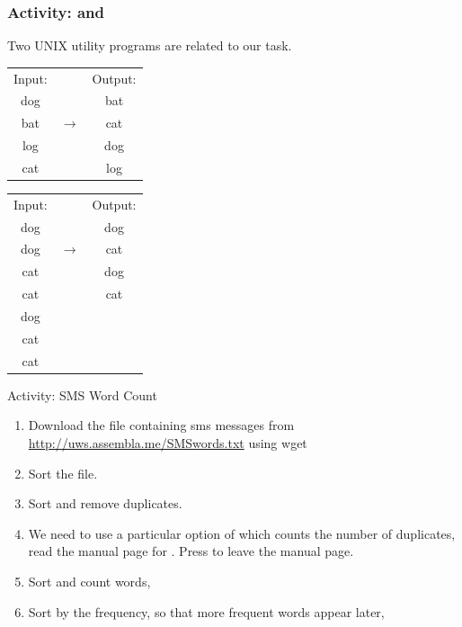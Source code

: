 
\begin{frame}[fragile]
\frametitle{Activity:  and }
Two UNIX utility programs are related to our task.  

\begin{block}{}
\begin{tabular}{c c c}
Input: & & Output: \\
dog    & & bat \\
bat    &$\longrightarrow$& cat \\
log    & & dog \\
cat    & & log \\
\end{tabular}
\end{block}

\begin{block}{}
\begin{tabular}{c c c}
Input: & & Output: \\
dog    & & dog \\
dog    &$\longrightarrow$& cat \\
cat    & & dog \\
cat    & & cat \\
dog    & & \\
cat    & & \\
cat    & & \\
\end{tabular}
\end{block}
\end{frame}

\begin{frame}[allowframebreaks=0.6]{Activity: SMS Word Count}

\begin{enumerate}
\item Download the file containing sms messages from \url{http://uws.assembla.me/SMSwords.txt} using wget 
\item Sort the file.   
\item Sort and remove duplicates.    
\item We need to use a particular option of  which counts the
number of duplicates, read the manual page for . Press 
to leave the manual page.  
\item Sort and count words,  
\item Sort by the frequency, so that more frequent words appear later, 
\end{enumerate}
\end{frame}

